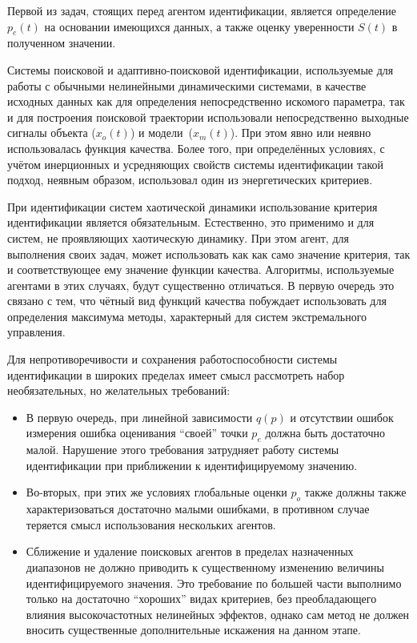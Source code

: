 Первой из задач, стоящих перед агентом идентификации,
является определение $p_e(t)$ на основании
имеющихся данных, а также оценку уверенности $S(t)$
в полученном значении.

Системы поисковой и адаптивно-поисковой идентификации,
используемые для работы с обычными нелинейными динамическими системами,
в качестве исходных данных как для определения непосредственно
искомого параметра, так и для построения поисковой траектории
использовали непосредственно выходные сигналы объекта ($x_o(t)$) и модели~($x_m(t)$).
При этом явно или неявно использовалась функция качества.
Более того, при определённых условиях, с учётом
инерционных и усредняющих свойств системы идентификации
такой подход, неявным образом, использовал
один из энергетических критериев.

При идентификации систем хаотической динамики
использование критерия идентификации является обязательным.
Естественно, это применимо и для систем, не проявляющих
хаотическую динамику. При этом агент,
для выполнения своих задач, может использовать
как как само значение критерия, так и соответствующее ему
значение функции качества. Алгоритмы,
используемые агентами в этих случаях,
будут существенно отличаться. В первую очередь
это связано с тем, что чётный вид функций качества
побуждает использовать для определения максимума
методы, характерный для систем экстремального управления.

Для непротиворечивости и сохранения работоспособности системы идентификации в широких
пределах имеет смысл рассмотреть набор необязательных,
но желательных требований:

\begin{itemize}

  \item
    В первую очередь, при линейной зависимости $q(p)$ и отсутствии ошибок измерения
    ошибка оценивания ``своей'' точки $p_e$ должна быть достаточно малой.
    Нарушение этого требования затрудняет работу системы идентификации
    при приближении к идентифицируемому значению.

  \item
    Во-вторых,
    при этих же условиях глобальные оценки $p_o$ также должны также
    характеризоваться достаточно малыми ошибками, в противном случае
    теряется смысл использования нескольких агентов.

  \item
    Сближение и удаление поисковых агентов в пределах назначенных
    диапазонов не должно приводить к существенному изменению величины
    идентифицируемого значения. Это требование по большей части выполнимо
    только на достаточно ``хороших'' видах критериев, без
    преобладающего влияния высокочастотных нелинейных эффектов,
    однако сам метод не должен вносить существенные дополнительные
    искажения на данном этапе.

\end{itemize}

